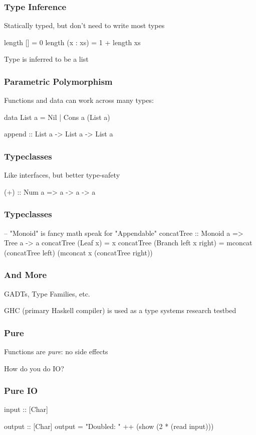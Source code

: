 \begin{frame}[fragile]
  \frametitle{Type Inference}

  Statically typed, but don't need to write most types

  \begin{semiverbatim}
length [] = 0
length (x : xs) = 1 + length xs
  \end{semiverbatim}

  Type is inferred to be a list
\end{frame}

\begin{frame}[fragile]
  \frametitle{Parametric Polymorphism}

  Functions and data can work across many types:

  \begin{semiverbatim}
data List a = Nil | Cons a (List a)

append :: List a -> List a -> List a
  \end{semiverbatim}
\end{frame}

\begin{frame}
  \frametitle{Typeclasses}

  Like interfaces, but better type-safety

  \begin{semiverbatim}
(+) :: Num a => a -> a -> a
  \end{semiverbatim}
\end{frame}

\begin{frame}[fragile]
  \frametitle{Typeclasses}
  \begin{semiverbatim}
-- "Monoid" is fancy math speak for "Appendable"
concatTree :: Monoid a => Tree a -> a
concatTree (Leaf x) = x
concatTree (Branch left x right) =
  mconcat (concatTree left)
          (mconcat x (concatTree right))
  \end{semiverbatim}
\end{frame}

\begin{frame}
  \frametitle{And More}

  GADTs, Type Families, etc.

  GHC (primary Haskell compiler) is used as a type systems research
  testbed
\end{frame}
  
\begin{frame}
  \frametitle{Pure}

  Functions are \emph{pure}: no side effects

  How do you do IO?
\end{frame}

\begin{frame}[fragile]
  \frametitle{Pure IO}

  \begin{semiverbatim}
input :: [Char]

output :: [Char]
output = "Doubled: " ++ (show (2 * (read input)))
  \end{semiverbatim}
\end{frame}
